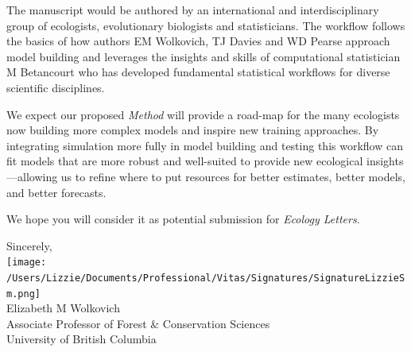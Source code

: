 \documentclass[11pt]{article}
\begin{document}

The manuscript would be authored by an international and interdisciplinary group of ecologists, evolutionary biologists and statisticians. The workflow follows the basics of how authors EM Wolkovich, TJ Davies and WD Pearse approach model building and leverages the insights and skills of computational statistician M Betancourt who has developed fundamental statistical workflows for diverse scientific disciplines. 

We expect our proposed \emph{Method} will provide a road-map for the many ecologists now building more complex models and inspire new training approaches. By integrating simulation more fully in model building and testing this workflow can fit models that are more robust and well-suited to provide new ecological insights---allowing us to refine where to put resources for better estimates, better models, and better forecasts. 

We hope you will consider it as potential submission for \emph{Ecology Letters}. 

Sincerely,\\

\texttt{[image: /Users/Lizzie/Documents/Professional/Vitas/Signatures/SignatureLizzieSm.png]} \\

Elizabeth M Wolkovich\\
Associate Professor of Forest \& Conservation Sciences\\ 
University of British Columbia\\
\end{document}
